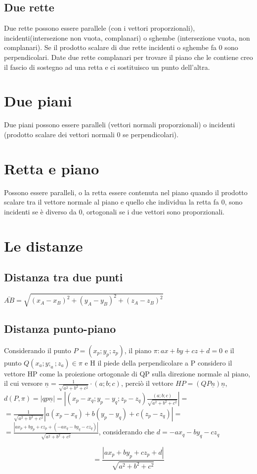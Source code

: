 \subsection{Due rette}
Due rette possono essere parallele (con i vettori proporzionali), incidenti(intersezione non vuota, complanari) o sghembe (intersezione vuota, non complanari). Se il 
prodotto scalare di due rette incidenti o sghembe fa 0 sono perpendicolari. Date due rette complanari per trovare il piano che le contiene creo il fascio di sostegno ad una retta e ci sostituisco un punto dell'altra.
\section{Due piani}
Due piani possono essere paralleli (vettori normali proporzionali) o incidenti (prodotto scalare dei vettori normali 0 se perpendicolari).
\section{Retta e piano}
Possono essere paralleli, o la retta essere contenuta nel piano quando il prodotto scalare tra il vettore normale al piano e quello che individua la retta fa 0, sono
incidenti se \`e diverso da 0, ortogonali se i due vettori sono proporzionali.
\section{Le distanze}
\subsection{Distanza tra due punti}
$\bar{AB}=\sqrt{(x_A-x_B)^2+(y_A-y_B)^2+(z_A-z_B)^2}$
\subsection{Distanza punto-piano}
Considerando il punto $P=(x_p;y_p;z_p)$, il piano $\pi:ax+by+cz+d=0$ e il punto $Q(x_a;y;_a;z_a)\in\pi$ e H il piede della perpendicolare a P considero il vettore HP come
la proiezione ortogonale di QP sulla direzione normale al piano, il cui versore $\underline{n}=\frac{1}{\sqrt{a^2+b^2+c^2}}\cdot(a;b;c)$, perci\`o il vettore $HP=(QP \underline{n})\underline{n}$, $d(P,\pi)=|qp\underline{n}|=|(x_p-x_q;y_p-y_q;z_p-z_q)\frac{(a;b;c)}{\sqrt{a^2+b^2+c^2}}|=$\\
$=\frac{1}{\sqrt{a^2+b^2+c^2}}|a(x_p-x_q)+b(y_p-y_q)+c(z_p-z_q)|=$\\
$=\frac{|ax_p+by_p+cz_p+(-ax_q-by_q-cz_q)|}{\sqrt{a^2+b^2+c^2}}$, considerando che $d=-ax_q-by_q-cz_q$\\
\begin{center}
\begin{equation}
=\frac{|ax_p+by_p+cz_p+d|}{\sqrt{a^2+b^2+c^2}}
\end{equation}
\end{center}
